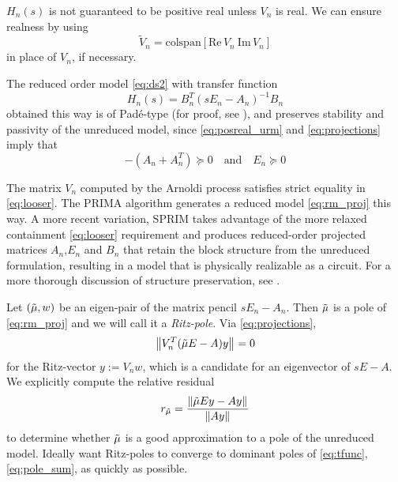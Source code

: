 \documentclass[letterpaper]{article}
\theoremstyle{remark}
\begin{document}
\begin{description}
 $H_n(s)$ is not guaranteed to be positive real unless $V_n$ is real. 
 We can ensure realness by using 
 \[
 \tilde{V}_n=\mathrm{colspan}\left[\mathrm{Re}\,V_n~\mathrm{Im}\,V_n\right]
 \]
 in place of $V_n$, if necessary.
 
 \smallskip
 The reduced order model \eqref{eq:ds2} with transfer function 
\begin{equation}
		H_n(s) = B_n^T\left(sE_n-A_n\right)^{-1}B_n
\label{eq:rm_proj}
\end{equation}
 obtained this way is of Pad\'{e}-type (for proof, see \cite[Theorem 2]{Jherm}), 
 and preserves 
 stability and passivity of the unreduced model, since \eqref{eq:posreal_urm}
 and \eqref{eq:projections} imply that
 \begin{equation*}
 -(A_n+A_n^T)\succeq 0 \quad\textrm{and}\quad E_n\succeq 0
\end{equation*} 


   The matrix $V_n$ computed by the Arnoldi process satisfies strict equality in 
   \eqref{eq:looser}. The PRIMA algorithm \cite{PRIMA} generates a reduced 
   model \eqref{eq:rm_proj} this way.  A more recent variation, SPRIM \cite{SPM}  
   takes advantage of the more relaxed containment \eqref{eq:looser} 
   requirement and produces
   reduced-order projected
   matrices $A_n$,$E_n$ and $B_n$ that retain the block structure from the
   unreduced formulation, resulting in a model that is physically realizable as a circuit.
   For a more thorough discussion of structure preservation, see \cite{SPM}.

   Let $(\tilde{\mu},w)$ be an eigen-pair of the matrix pencil $sE_n-A_n$.  Then
    $\tilde{\mu}$ is a pole of \eqref{eq:rm_proj} and we will call it a \emph{Ritz-pole}.
   Via \eqref{eq:projections},
   \begin{equation}
   \left\| V_n^T(\tilde{\mu} E - A)y \right\|_{} = 0
   \label{eq:approx_pole}
   \end{equation}
   for the Ritz-vector $y:=V_n w$, which is a candidate for an eigenvector 
   of $sE-A$. We explicitly compute the relative residual 
   \begin{equation}
	   r_{\tilde{\mu}} = \frac{\left\| \tilde{\mu} Ey - Ay \right\|_{}}{\left\| Ay \right\|_{}}
	   \label{eq:rr}
   \end{equation}
   to determine whether 
    $\tilde{\mu}$ is a good approximation to a pole of the
   unreduced model.
   Ideally want Ritz-poles to converge to dominant poles of \eqref{eq:tfunc},
   \eqref{eq:pole_sum}, as quickly as possible.		
  

\end{description}
\end{document}
